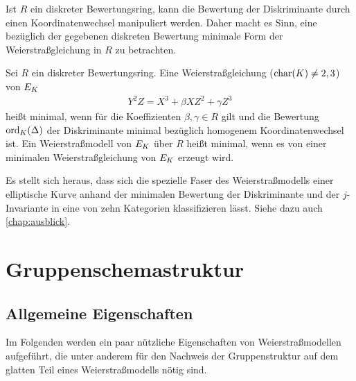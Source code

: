 Ist $R$ ein diskreter Bewertungsring, kann die Bewertung der
Diskriminante durch einen Koordinatenwechsel manipuliert werden. Daher
macht es Sinn, eine bezüglich der gegebenen diskreten Bewertung minimale
Form der Weierstraßgleichung in $R$ zu betrachten.
\begin{Definition}
  Sei $R$ ein diskreter Bewertungsring.
  Eine Weierstraßgleichung ($\operatorname{char}(K)\neq2,3$) von $E_{K}$
  \begin{gather*}
    Y^2Z = X^3 + \beta XZ^2 + \gamma Z^3
  \end{gather*}
  heißt minimal, wenn für die Koeffizienten ${\beta, \gamma\in R}$ gilt
  und die Bewertung $\operatorname{ord}_{K}(\Delta)$ der Diskriminante minimal
  bezüglich homogenem Koordinatenwechsel ist.
  Ein Weierstraßmodell von $E_{K}$ über $R$ heißt minimal,
  wenn es von einer minimalen Weierstraßgleichung von $E_{K}$ erzeugt
  wird.
\end{Definition}
Es stellt sich heraus, dass sich die spezielle Faser des
Weierstraßmodells einer elliptische Kurve anhand der minimalen
Bewertung der Diskriminante und der $j$-Invariante in eine von zehn
Kategorien klassifizieren lässt. Siehe dazu auch \autoref{chap:ausblick}. 


\section{Gruppenschemastruktur}\label{chap:weierstraßgruppe}
\subsection{Allgemeine Eigenschaften}
Im Folgenden werden ein paar nützliche Eigenschaften von
Weierstraßmodellen aufgeführt, die unter anderem für den Nachweis der
Gruppenstruktur auf dem glatten Teil eines Weierstraßmodells nötig
sind.

